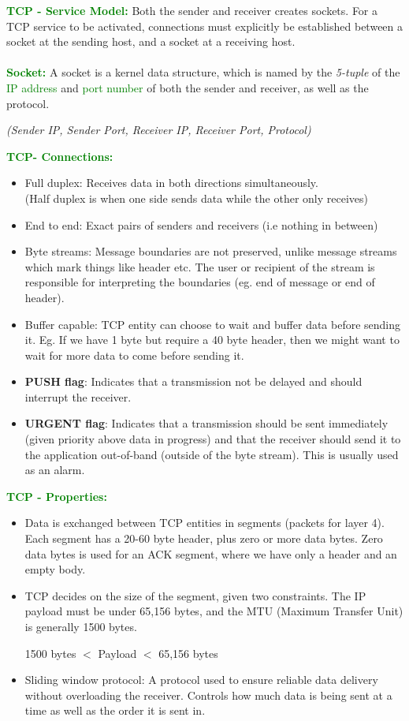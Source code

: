\documentclass[a4paper,10pt]{article}
\begin{document}
\textcolor{Green}{\textbf{TCP - Service Model:}} Both the sender and receiver creates sockets. For a TCP service to be activated, connections must explicitly be established between a socket at the sending host, and a socket at a receiving host.\\\\
\textcolor{Green}{\textbf{Socket:}} A socket is a kernel data structure, which is named by the \emph{5-tuple} of the \textcolor{Green}{IP address} and \textcolor{Green}{port number} of both the sender and receiver, as well as the protocol.
\begin{center}
	\textit{(Sender IP, Sender Port, Receiver IP, Receiver Port, Protocol)}
\end{center}
\textcolor{Green}{\textbf{TCP- Connections:}}
\begin{itemize}
	\item Full duplex: Receives data in both directions simultaneously. \\ (Half duplex is when one side sends data while the other only receives)
	\item End to end: Exact pairs of senders and receivers (i.e nothing in between)
	\item Byte streams: Message boundaries are not preserved, unlike message streams which mark things like header etc. The user or recipient of the stream is responsible for interpreting the boundaries (eg. end of message or end of header). 
	\item Buffer capable: TCP entity can choose to wait and buffer data before sending it. Eg. If we have 1 byte but require a 40 byte header, then we might want to wait for more data to come before sending it. 
	\item \textbf{PUSH flag}: Indicates that a transmission not be delayed and should interrupt the receiver. 
	\item \textbf{URGENT flag}: Indicates that a transmission should be sent immediately (given priority above data in progress) and that the receiver should send it to the application out-of-band (outside of the byte stream). This is usually used as an alarm. 
\end{itemize}
\textcolor{Green}{\textbf{TCP - Properties:}}
\begin{itemize}
	\item Data is exchanged between TCP entities in segments (packets for layer 4). Each segment has a 20-60 byte header, plus zero or more data bytes. Zero data bytes is used for an ACK segment, where we have only a header and an empty body. 
	\item TCP decides on the size of the segment, given two constraints. The IP payload must be under 65,156 bytes, and the MTU (Maximum Transfer Unit) is generally 1500 bytes. 
	\begin{center}
		1500 bytes $<$ Payload $<$ 65,156 bytes
	\end{center}
	\item Sliding window protocol: A protocol used to ensure reliable data delivery without overloading the receiver. Controls how much data is being sent at a time as well as the order it is sent in. 
\end{itemize}
\end{document}
